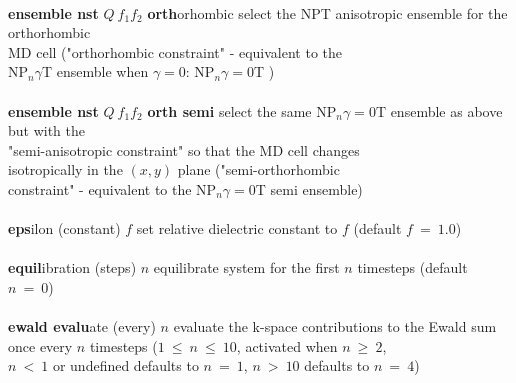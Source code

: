 \begin{tabbing}
\>                                              \> \\
\> {\bf ensemble nst} $Q~f_{1} f_{2}$ {\bf orth}orhombic
                                                \> \phantom{xxx} select the NPT anisotropic ensemble for the orthorhombic\\
\>                                              \> \phantom{xxx} MD cell ("orthorhombic constraint" - equivalent to the \\
\>                                              \> \phantom{xxx} NP$_{n}\gamma$T ensemble when $\gamma=0$: NP$_{n}\gamma=0$T ) \\
\>                                              \> \\
\> {\bf ensemble nst} $Q~f_{1} f_{2}$ {\bf orth semi}
                                                \> \phantom{xxx} select the same NP$_{n}\gamma=0$T ensemble as above but with the \\
\>                                              \> \phantom{xxx} "semi-anisotropic constraint" so that the MD cell changes \\
\>                                              \> \phantom{xxx} isotropically in the $(x,y)$ plane ("semi-orthorhombic \\
\>                                              \> \phantom{xxx} constraint" - equivalent to the NP$_{n}\gamma=0$T semi ensemble) \\
\>                                              \> \\
\> {\bf eps}ilon (constant) $f$                 \> set relative dielectric constant to $f$ (default $f~=~1.0$) \\
\>                                              \> \\
\> {\bf equil}ibration (steps) $n$              \> equilibrate system for the first $n$ timesteps (default $n~=~0$) \\
\>                                              \> \\
\> {\bf ewald evalu}ate (every) $n$             \> evaluate the k-space contributions to the Ewald sum \\
\>                                              \> once every $n$ timesteps ($1~\le~n~\le~10$, activated when $n~\ge~2$, \\
\>                                              \> $n~<~1$ or undefined defaults to $n~=~1$, $n~>~10$ defaults to $n~=~4$) \\
\>                                              \> \\

\end{tabbing}
